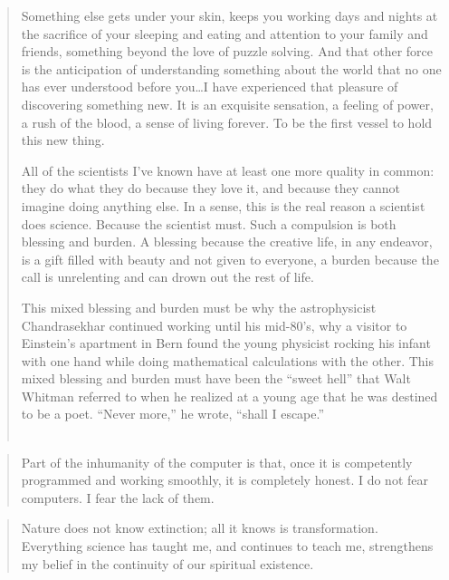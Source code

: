 \documentclass[letterpaper,draft]{memoir}
\begin{document}
\begin{quote}Something else gets under your skin, keeps you working days and nights at the
sacrifice of your sleeping and eating and attention to your family and friends,
something beyond the love of puzzle solving. And that other force is the
anticipation of understanding something about the world that no one has ever
understood before you\ldots I have experienced that pleasure of discovering
something new. It is an exquisite sensation, a feeling of power, a rush of the
blood, a sense of living forever. To be the first vessel to hold this new
thing.

\noindent All of the scientists I've known have at least one more quality in common:
they do what they do because they love it, and because they cannot imagine
doing anything else. In a sense, this is the real reason a scientist does
science. Because the scientist must. Such a compulsion is both blessing and
burden. A blessing because the creative life, in any endeavor, is a gift
filled with beauty and not given to everyone, a burden because the call is
unrelenting and can drown out the rest of life.

\noindent This mixed blessing and burden must be why the astrophysicist Chandrasekhar
continued working until his mid-80's, why a visitor to Einstein's apartment in
Bern found the young physicist rocking his infant with one hand while doing
mathematical calculations with the other. This mixed blessing and burden must
have been the ``sweet hell'' that Walt Whitman referred to when he realized at a
young age that he was destined to be a poet. ``Never more,'' he wrote, ``shall I
escape.''\\
\\
\end{quote}
\vspace{.2in}
\begin{quote}Part of the inhumanity of the computer is that, once it is competently
 programmed and working smoothly, it is completely honest. I do not fear
 computers. I fear the lack of them.\\
\end{quote}
\vspace{.2in}
\begin{quote}Nature does not know extinction; all it knows is transformation. Everything
 science has taught me, and continues to teach me, strengthens my belief in the
 continuity of our spiritual existence.\\
\vspace{2mm}
\end{quote}
\end{document}
